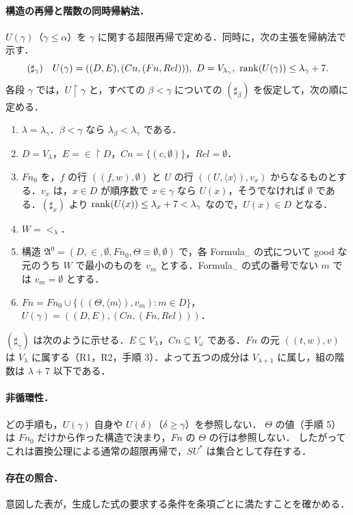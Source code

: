 \paragraph{構造の再帰と階数の同時帰納法．}
$U(\gamma)$（$\gamma\le\alpha$）を $\gamma$ に関する超限再帰で定める．同時に，次の主張を帰納法で示す．
\[ (\sharp_\gamma)\quad U(\gamma)=((D,E),(Cn,(Fn,Rel))),\ D=V_{\lambda_\gamma},\ \rank(U(\gamma))\le\lambda_\gamma+7. \]
各段 $\gamma$ では，$U\restriction\gamma$ と，すべての $\beta<\gamma$ についての $(\sharp_\beta)$ を仮定して，次の順に定める．
\begin{enumerate}
\item $\lambda=\lambda_\gamma$．$\beta<\gamma$ なら $\lambda_\beta<\lambda_\gamma$ である．
\item $D=V_\lambda$，$E=\in\restriction D$，$Cn=\{(c,\emptyset)\}$，$Rel=\emptyset$．
\item $Fn_0$ を，$f$ の行 $((f,w),\emptyset)$ と $U$ の行 $((U,\langle x\rangle),v_x)$ からなるものとする．$v_x$ は，$x\in D$ が順序数で $x\in\gamma$ なら $U(x)$，そうでなければ $\emptyset$ である．$(\sharp_x)$ より $\operatorname{rank}(U(x))\le\lambda_x+7<\lambda_\gamma$ なので，$U(x)\in D$ となる．
\item $W=<_\lambda$．
\item 構造 $\mathfrak A^0=(D,\in,\emptyset,Fn_0,\Theta\equiv\emptyset,\emptyset)$ で，各 Formula$_-$ の式について good な元のうち $W$ で最小のものを $v_m$ とする．Formula$_-$ の式の番号でない $m$ では $v_m=\emptyset$ とする．
\item $Fn=Fn_0\cup\{((\Theta,\langle m\rangle),v_m):m\in D\}$，$U(\gamma)=((D,E),(Cn,(Fn,Rel)))$．
\end{enumerate}
$(\sharp_\gamma)$ は次のように示せる．$E\subseteq V_\lambda$，$Cn\subseteq V_\omega$ である．$Fn$ の元 $((t,w),v)$ は $V_\lambda$ に属する（R1，R2，手順 3）．よって五つの成分は $V_{\lambda+1}$ に属し，組の階数は $\lambda+7$ 以下である．

\paragraph{非循環性．}
どの手順も，$U(\gamma)$ 自身や $U(\delta)$（$\delta\ge\gamma$）を参照しない．
$\Theta$ の値（手順 5）は $Fn_0$ だけから作った構造で決まり，$Fn$ の $\Theta$ の行は参照しない．
したがってこれは置換公理による通常の超限再帰で，$SU^*$ は集合として存在する．

\paragraph{存在の照合．}
意図した表が，生成した式の要求する条件を条項ごとに満たすことを確かめる．

